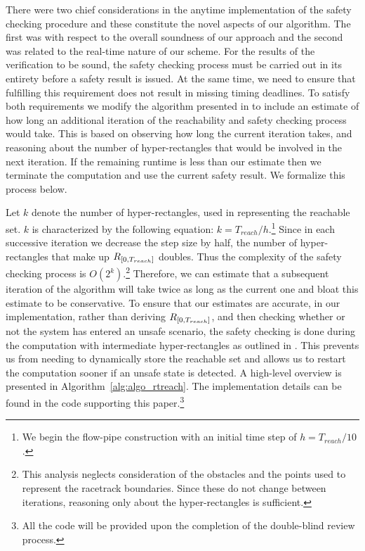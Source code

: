 \documentclass[manuscript,screen,review]{acmart}
\begin{document}
There were two chief considerations in the anytime implementation of the safety checking procedure and these constitute the novel aspects of our algorithm. The first was with respect to the overall soundness of our approach and the second was related to the real-time nature of our scheme. For the results of the verification to be sound, the safety checking process must be carried out in its entirety before a safety result is issued. At the same time, we need to ensure that fulfilling this requirement does not result in missing timing deadlines. To satisfy both requirements we modify the algorithm presented in \cite{Bak2014} to include an estimate of how long an additional iteration of the reachability and safety checking process would take. This is based on observing how long the current iteration takes, and reasoning about the number of hyper-rectangles that would be involved in the next iteration. If the remaining runtime is less than our estimate then we terminate the computation and use the current safety result. We formalize this process below.

Let $k$ denote the number of hyper-rectangles, used in representing the reachable set. $k$ is characterized by the following equation: $k = T_{reach} / h$.\footnote{We begin the flow-pipe construction with an initial time step of $h = T_{reach}/10$.} Since in each successive iteration we decrease the step size by half, the number of hyper-rectangles that make up $\mathnormal{R}_{[0,T_{reach}]}$ doubles. Thus the complexity of the safety checking process is $O(2^k)$.\footnote{This analysis neglects consideration of the obstacles and the points used to represent the racetrack boundaries. Since these do not change between iterations, reasoning only about the hyper-rectangles is sufficient.} Therefore, we can estimate that a subsequent iteration of the algorithm will take twice as long as the current one and bloat this estimate to be conservative. To ensure that our estimates are accurate, in our implementation, rather than deriving $\mathnormal{R}_{[0,T_{reach}]}$, and then checking whether or not the system has entered an unsafe scenario, the safety checking is done during the computation with intermediate hyper-rectangles as outlined in \cite{Bak2014}. This prevents us from needing to dynamically store the reachable set and allows us to restart the computation sooner if an unsafe state is detected. A high-level overview is presented in Algorithm~\ref{alg:algo_rtreach}. The implementation details can be found in the code supporting this paper.\footnote{All the code will be provided upon the completion of the double-blind review process.} 
\end{document}
